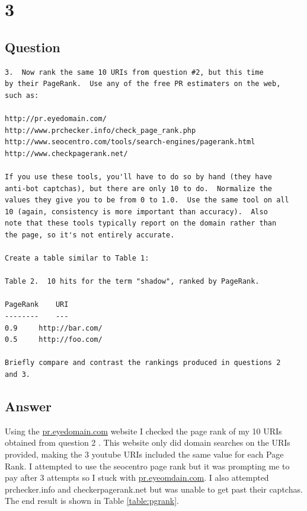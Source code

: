\documentclass[letterpaper,11pt]{article}
\begin{document}
\clearpage


\section*{3}

\subsection*{Question}

\begin{verbatim}
3.  Now rank the same 10 URIs from question #2, but this time 
by their PageRank.  Use any of the free PR estimaters on the web,
such as:

http://pr.eyedomain.com/
http://www.prchecker.info/check_page_rank.php
http://www.seocentro.com/tools/search-engines/pagerank.html
http://www.checkpagerank.net/

If you use these tools, you'll have to do so by hand (they have
anti-bot captchas), but there are only 10 to do.  Normalize the
values they give you to be from 0 to 1.0.  Use the same tool on all
10 (again, consistency is more important than accuracy).  Also
note that these tools typically report on the domain rather than
the page, so it's not entirely accurate.  

Create a table similar to Table 1:

Table 2.  10 hits for the term "shadow", ranked by PageRank.

PageRank	URI
--------	---
0.9		http://bar.com/
0.5		http://foo.com/

Briefly compare and contrast the rankings produced in questions 2
and 3.
\end{verbatim}

\clearpage
\subsection*{Answer}

Using the \url{pr.eyedomain.com} website I checked the page rank of my 10 URIs obtained from question 2 \cite{eyedomainref}. This website only did domain searches on the URIs provided, making the 3 youtube URIs included the same value for each Page Rank. I attempted to use the seocentro page rank but it was prompting me to pay after 3 attempts so I stuck with \url{pr.eyeomdain.com}. I also attempted prchecker.info and checkerpagerank.net but was unable to get past their captchas. The end result is shown in Table \ref{table:pgrank}.
\end{document}
